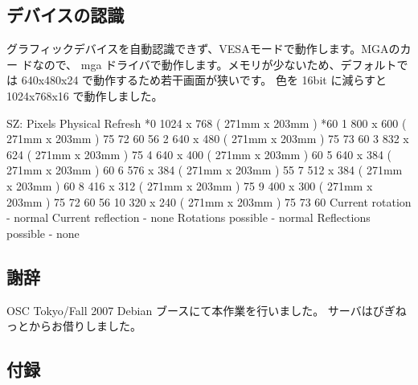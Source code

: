 \documentclass[mingoth,a4paper]{jsarticle}
\begin{document}
\subsection{デバイスの認識}

グラフィックデバイスを自動認識できず、VESAモードで動作します。MGAのカー
ドなので、 mga ドライバで動作します。メモリが少ないため、デフォルトでは 
640x480x24 で動作するため若干画面が狭いです。 色を 16bit に減らすと 
1024x768x16 で動作しました。

\begin{commandline}
 SZ:    Pixels          Physical       Refresh
*0   1024 x 768    ( 271mm x 203mm )  *60  
 1    800 x 600    ( 271mm x 203mm )   75   72   60   56  
 2    640 x 480    ( 271mm x 203mm )   75   73   60  
 3    832 x 624    ( 271mm x 203mm )   75  
 4    640 x 400    ( 271mm x 203mm )   60  
 5    640 x 384    ( 271mm x 203mm )   60  
 6    576 x 384    ( 271mm x 203mm )   55  
 7    512 x 384    ( 271mm x 203mm )   60  
 8    416 x 312    ( 271mm x 203mm )   75  
 9    400 x 300    ( 271mm x 203mm )   75   72   60   56  
 10   320 x 240    ( 271mm x 203mm )   75   73   60  
Current rotation - normal
Current reflection - none
Rotations possible - normal 
Reflections possible - none
\end{commandline}

\subsection{謝辞}

OSC Tokyo/Fall 2007 Debian ブースにて本作業を行いました。
サーバはびぎねっとからお借りしました。

\subsection{付録}
\end{document}
